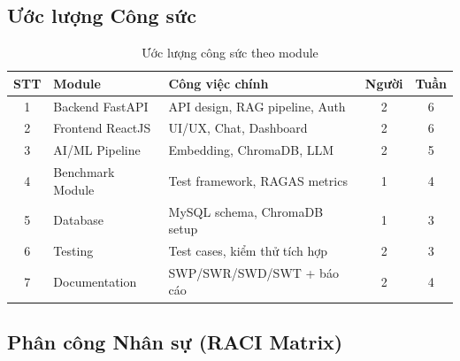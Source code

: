\subsection{Ước lượng Công sức}

\begin{table}[H]
  \centering
  \caption{Ước lượng công sức theo module}
  \label{tab:effort}
  \renewcommand{\arraystretch}{1.4}
  \begin{tabularx}{\textwidth}{|c|l|X|c|c|}
    \hline
    \rowcolor{blue!10}
    \textbf{STT} & \textbf{Module} & \textbf{Công việc chính} & \textbf{Người} & \textbf{Tuần} \\
    \hline
    1 & Backend FastAPI & API design, RAG pipeline, Auth & 2 & 6 \\
    \hline
    2 & Frontend ReactJS & UI/UX, Chat, Dashboard & 2 & 6 \\
    \hline
    3 & AI/ML Pipeline & Embedding, ChromaDB, LLM & 2 & 5 \\
    \hline
    4 & Benchmark Module & Test framework, RAGAS metrics & 1 & 4 \\
    \hline
    5 & Database & MySQL schema, ChromaDB setup & 1 & 3 \\
    \hline
    6 & Testing & Test cases, kiểm thử tích hợp & 2 & 3 \\
    \hline
    7 & Documentation & SWP/SWR/SWD/SWT + báo cáo & 2 & 4 \\
    \hline
  \end{tabularx}
\end{table}

\subsection{Phân công Nhân sự (RACI Matrix)}

